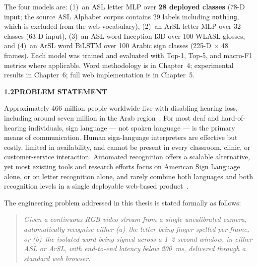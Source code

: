 \noindent The four models are: (1)~an ASL letter MLP over \textbf{28 deployed classes} (78-D input; the source ASL Alphabet corpus contains 29 labels including \texttt{nothing}, which is excluded from the web vocabulary), (2)~an ArSL letter MLP over 32 classes (63-D input), (3)~an ASL word Inception I3D over 100 WLASL glosses, and (4)~an ArSL word BiLSTM over 100 Arabic sign classes (225-D $\times$ 48 frames). Each model was trained and evaluated with Top-1, Top-5, and macro-F1 metrics where applicable. Word methodology is in Chapter~4; experimental results in Chapter~6; full web implementation is in Chapter~5.\par\vspace{0.6cm}

\noindent\textbf{1.2\quad PROBLEM STATEMENT}\par
{}
\vspace{0.4cm}

\noindent Approximately 466 million people worldwide live with disabling hearing loss, including around seven million in the Arab region~\cite{who2024hearing}. For most deaf and hard-of-hearing individuals, sign language --- not spoken language --- is the primary means of communication. Human sign-language interpreters are effective but costly, limited in availability, and cannot be present in every classroom, clinic, or customer-service interaction. Automated recognition offers a scalable alternative, yet most existing tools and research efforts focus on American Sign Language alone, or on letter recognition alone, and rarely combine both languages and both recognition levels in a single deployable web-based product~\cite{rastgoo2021survey,adaloglou2022comprehensive}.\par\vspace{0.4cm}

\noindent The engineering problem addressed in this thesis is stated formally as follows:\par\vspace{0.3cm}

\begin{quote}
\noindent\textit{Given a continuous RGB video stream from a single uncalibrated camera, automatically recognise either (a)~the letter being finger-spelled per frame, or (b)~the isolated word being signed across a 1--2 second window, in either ASL or ArSL, with end-to-end latency below 200~ms, delivered through a standard web browser.}
\end{quote}
\vspace{0.3cm}

